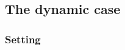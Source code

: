 \documentclass[12pt,english]{article}
\begin{document}




\subsection{The dynamic case}\label{the-dynamic-case}

\subsubsection*{Setting}\label{setting-1}
\end{document}
